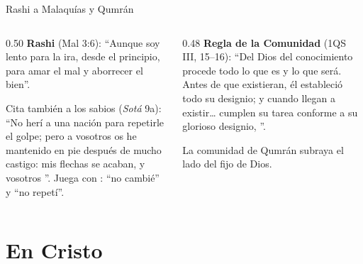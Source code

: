 \begin{frame}{Rashi a Malaquías y Qumrán}
\begin{columns}[t,onlytextwidth]
\begin{column}{0.50\textwidth}\scriptsize
\textbf{Rashi} (Mal 3:6): ``Aunque soy lento para la ira,  desde el principio, para amar el mal y aborrecer el bien''.\par\smallskip
Cita también a los sabios (\emph{Sotá} 9a): ``No herí a una nación para repetirle el golpe; pero a vosotros os he mantenido en pie después de mucho castigo: mis flechas se acaban, y vosotros ''. Juega con : ``no cambié'' y ``no repetí''.
\end{column}
\begin{column}{0.48\textwidth}\scriptsize
\textbf{Regla de la Comunidad} (1QS III, 15--16): ``Del Dios del conocimiento procede todo lo que es y lo que será. Antes de que existieran, él estableció todo su designio; y cuando llegan a existir\ldots{} cumplen su tarea conforme a su glorioso designio, ''.\par\smallskip
La comunidad de Qumrán subraya el lado del  fijo de Dios.
\end{column}
\end{columns}\par\smallskip
{}
\end{frame}

\section{En Cristo}

